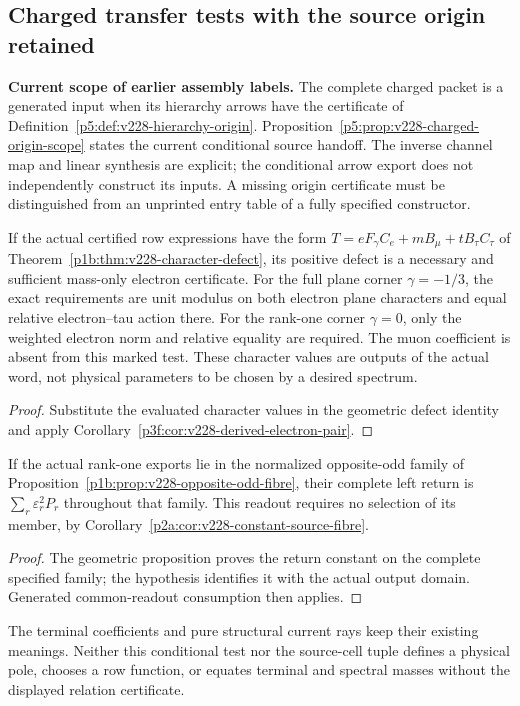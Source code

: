 \documentclass[12pt,a4paper]{article}
\begin{document}
\subsection{Charged transfer tests with the source origin retained}
\label{p5b:sec:v228-source-character-consumption}
\noindent\textbf{Current scope of earlier assembly labels.}
The complete charged packet is a generated input when its hierarchy arrows
have the certificate of Definition~\ref{p5:def:v228-hierarchy-origin}.
Proposition~\ref{p5:prop:v228-charged-origin-scope} states the current
conditional source handoff. The inverse channel map and linear synthesis
are explicit; the conditional arrow export does not independently construct
its inputs. A missing origin certificate must be distinguished from an
unprinted entry table of a fully specified constructor.
\begin{corollary}
\label{p5b:cor:v228-source-character-test}
If the actual certified row expressions have the form
$T=eF_\gamma C_e+mB_\mu+tB_\tau C_\tau$ of
Theorem~\ref{p1b:thm:v228-character-defect}, its positive defect is a
necessary and sufficient mass-only electron certificate. For the full plane
corner $\gamma=-1/3$, the exact requirements are unit modulus on both
electron plane characters and equal relative electron--tau action there.
For the rank-one corner $\gamma=0$, only the weighted electron norm and
relative equality are required. The muon coefficient is absent from this
marked test. These character values are outputs of the actual word, not
physical parameters to be chosen by a desired spectrum.
\end{corollary}
\begin{proof}
Substitute the evaluated character values in the geometric defect identity
and apply Corollary~\ref{p3f:cor:v228-derived-electron-pair}.
\end{proof}
\begin{corollary}
\label{p5b:cor:v228-source-fibre-readout}
If the actual rank-one exports lie in the normalized opposite-odd family of
Proposition~\ref{p1b:prop:v228-opposite-odd-fibre}, their complete left
return is $\sum_r\varepsilon_r^2P_r$ throughout that family. This readout
requires no selection of its member, by
Corollary~\ref{p2a:cor:v228-constant-source-fibre}.
\end{corollary}
\begin{proof}
The geometric proposition proves the return constant on the complete
specified family; the hypothesis identifies it with the actual output
domain. Generated common-readout consumption then applies.
\end{proof}
The terminal coefficients and pure structural current rays keep their
existing meanings. Neither this conditional test nor the source-cell tuple
defines a physical pole, chooses a row function, or equates terminal and
spectral masses without the displayed relation certificate.
\end{document}

